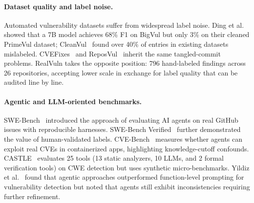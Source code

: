 \paragraph{Dataset quality and label noise.}
Automated vulnerability datasets suffer from widespread label noise. Ding et al.~\cite{ding2024primevul} showed that a 7B model achieves 68\% F1 on BigVul but only 3\% on their cleaned PrimeVul dataset; CleanVul~\cite{li2025cleanvul} found over 40\% of entries in existing datasets mislabeled. CVEFixes~\cite{bhandari2021cvefixes} and ReposVul~\cite{wang2024reposvul} inherit the same tangled-commit problems. RealVuln takes the opposite position: 796 hand-labeled findings across 26 repositories, accepting lower scale in exchange for label quality that can be audited line by line.

\paragraph{Agentic and LLM-oriented benchmarks.}
SWE-Bench~\cite{jimenez2024swebench} introduced the approach of evaluating AI agents on real GitHub issues with reproducible harnesses. SWE-Bench Verified~\cite{openai2025swebenchverified} further demonstrated the value of human-validated labels. CVE-Bench~\cite{zhu2025cvebench} measures whether agents can exploit real CVEs in containerized apps, highlighting knowledge-cutoff confounds. CASTLE~\cite{dubniczky2025castle} evaluates 25 tools (13 static analyzers, 10 LLMs, and 2 formal verification tools) on CWE detection but uses synthetic micro-benchmarks. Yildiz et al.~\cite{yildiz2025jitvul} found that agentic approaches outperformed function-level prompting for vulnerability detection but noted that agents still exhibit inconsistencies requiring further refinement.

